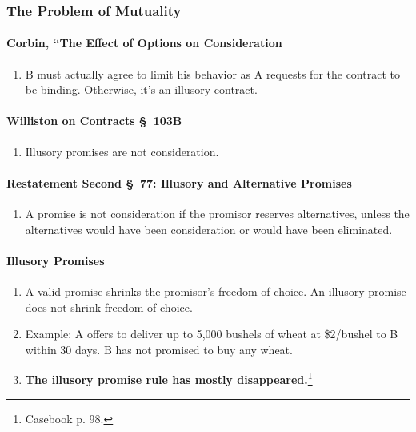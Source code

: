 \subsubsection{The Problem of Mutuality}

\paragraph{Corbin, ``The Effect of Options on Consideration}

\begin{enumerate}
    \item B must actually agree to limit his behavior as A requests for the 
    contract to be binding. Otherwise, it's an illusory contract.
\end{enumerate}

\paragraph{Williston on Contracts \S\ 103B}

\begin{enumerate}
    \item Illusory promises are not consideration.
\end{enumerate}

\paragraph{Restatement Second \S\ 77: Illusory and Alternative Promises}

\begin{enumerate}
    \item A promise is not consideration if the promisor reserves 
    alternatives, unless the alternatives would have been consideration or 
    would have been eliminated.
\end{enumerate}

\paragraph{Illusory Promises}

\begin{enumerate}
    \item A valid promise shrinks the promisor's freedom of choice. An 
    illusory promise does not shrink freedom of choice.
    \item Example: A offers to deliver up to 5,000 bushels of wheat at 
    \$2/bushel to B within 30 days. B has not promised to buy any wheat.
    \item \textbf{The illusory promise rule has mostly 
    disappeared.}\footnote{Casebook p. 98.}
\end{enumerate}

